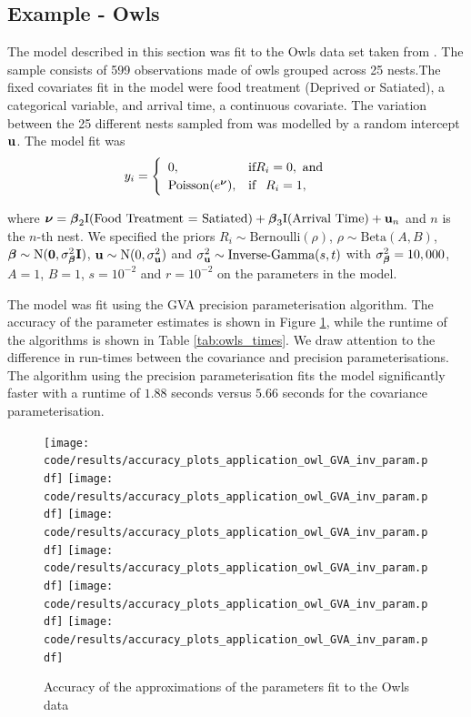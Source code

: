 \subsection{Example - Owls}
\label{sec:owls}

The model described in this section was fit to the Owls data set taken from
\cite{zuur_mixed_2009}.  The sample consists of 599 observations made of owls
grouped across 25 nests.The fixed covariates fit in the model were food
treatment (Deprived or Satiated), a categorical variable, and arrival time, a
continuous covariate.  The variation between the 25 different nests sampled
from was modelled by a random intercept ${\bf u}$. The model fit was
\begin{equation*}
	y_i = \begin{cases}
	\begin{array}{ll}
	0, & \text{if} R_i = 0, \text{ and } \\
	\text{Poisson}(e^{\boldsymbol \nu}), & \text{if} \phantom{-} R_i = 1,
	\end{array}
	\end{cases}
\end{equation*}

\noindent where ${\boldsymbol \nu} = {{\boldsymbol \beta}_2 \text{I}(\text{Food Treatment = Satiated}) +
{\boldsymbol \beta}_3 \text{I}(\text{Arrival Time}) + {\bf u}_n}$ and $n$ is the $n$-th nest.  We
specified the priors $R_i \sim \text{Bernoulli}(\rho)$, $\rho \sim
\text{Beta}(A, B)$, ${\boldsymbol \beta} \sim \text{N}({\bf 0}, \sigma_{{\boldsymbol \beta}}^2 {\bf I})$, ${\bf u}
\sim \text{N}(0, \sigma_{{\bf u}}^2)$ and $\sigma_{\bf u}^2 \sim
\text{Inverse-Gamma}(s, t)$ with $\sigma_{\boldsymbol \beta}^2=10,000$, $A=1$, $B=1$,
$s=10^{-2}$ and $r=10^{-2}$ on the parameters in the model.

The model was fit using the GVA precision parameterisation algorithm. The
accuracy of the parameter estimates is shown in Figure \ref{fig:owls}, while
the runtime of the algorithms is shown in Table \ref{tab:owls_times}. We draw
attention to the difference in run-times between the covariance and precision
parameterisations. The algorithm using the precision parameterisation fits the
model significantly faster with a runtime of $1.88$ seconds versus $5.66$
seconds for the covariance parameterisation.

\begin{figure}[h]
	\centering
	\texttt{[image: code/results/accuracy\_plots\_application\_owl\_GVA\_inv\_param.pdf]}
	\texttt{[image: code/results/accuracy\_plots\_application\_owl\_GVA\_inv\_param.pdf]}
	\texttt{[image: code/results/accuracy\_plots\_application\_owl\_GVA\_inv\_param.pdf]}
	\texttt{[image: code/results/accuracy\_plots\_application\_owl\_GVA\_inv\_param.pdf]}
	\texttt{[image: code/results/accuracy\_plots\_application\_owl\_GVA\_inv\_param.pdf]}
	\texttt{[image: code/results/accuracy\_plots\_application\_owl\_GVA\_inv\_param.pdf]}
	\caption{Accuracy of the approximations of the parameters fit to the Owls data}
	\label{fig:owls}
\end{figure}

